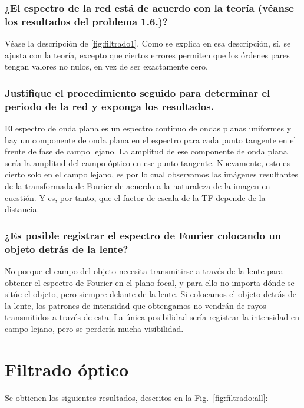\documentclass{./packages/optica-article}
\begin{document}
\subsubsection{¿El espectro de la red está de acuerdo con la teoría (véanse los resultados del problema 1.6.)?}
Véase la descripción de \ref{fig:filtrado1}. Como se explica en esa descripción, sí, se ajusta con la teoría, excepto que ciertos errores permiten que los órdenes pares tengan valores no nulos, en vez de ser exactamente cero.

\subsubsection{ Justifique el procedimiento seguido para determinar el periodo de la red y exponga los resultados.}
 El espectro de onda plana es un espectro continuo de ondas planas uniformes y hay un componente de onda plana en el espectro para cada punto tangente en el frente de fase de campo lejano. La amplitud de ese componente de onda plana sería la amplitud del campo óptico en ese punto tangente. Nuevamente, esto es cierto solo en el campo lejano, es por lo cual observamos las imágenes resultantes de la transformada de Fourier de acuerdo a la naturaleza de la imagen en cuestión. Y es, por tanto, que el factor de escala de la TF depende de la distancia.
	
\subsubsection{¿Es posible registrar el espectro de Fourier colocando un objeto detrás de la lente?}

No porque el campo del objeto necesita transmitirse a través de la lente para obtener el espectro de Fourier en el plano focal, y para ello no importa dónde se sitúe el objeto, pero siempre delante de la lente. Si colocamos el objeto detrás de la lente, los patrones de intensidad que obtengamos no vendrán de rayos transmitidos a través de esta. La única posibilidad sería registrar la intensidad en campo lejano, pero se perdería mucha visibilidad. 



\section{Filtrado óptico}
Se obtienen los siguientes resultados, descritos en la Fig.~\ref{fig:filtrado:all}:
\end{document}
